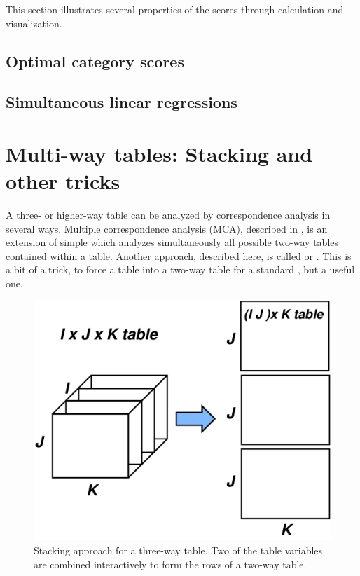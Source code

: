 \documentclass[11pt]{book}
\begin{document}
This section illustrates several properties of the \ca
scores through calculation and visualization.


\subsection{Optimal category scores}\label{sec:ca-optimal-scores}

\subsection{Simultaneous linear regressions}\label{sec:ca-linreg}


\section{Multi-way tables: Stacking and other tricks}\label{sec:ca-multiway}

A three- or higher-way table can be analyzed by correspondence
analysis in several ways.
Multiple correspondence analysis (MCA), described in ,
is an extension of simple
\ca which analyzes simultaneously all possible two-way tables
contained within a \mway table.
Another approach, described here, is called 
 or . This is a bit of a trick, 
to force a \mway table into a two-way table for a standard \ca,
but a useful one.

\begin{figure}
\centering
\includegraphics[width=.6\textwidth]{ch06/fig/stacking}
\caption{Stacking approach for a three-way table. Two of the table variables are combined interactively to form the rows of a two-way table.}\label{fig:stacking}
\end{figure}
\end{document}

